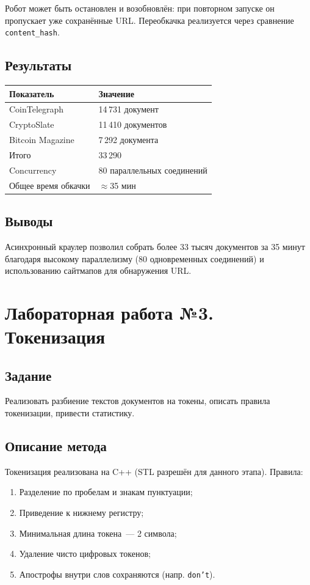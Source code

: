 \documentclass[12pt,a4paper]{article}
\begin{document}
Робот может быть остановлен и возобновлён: при повторном запуске он пропускает уже
сохранённые URL. Переобкачка реализуется через сравнение \texttt{content\_hash}.

\subsection{Результаты}
\begin{table}[H]
\centering
\begin{tabular}{ll}
\toprule
\textbf{Показатель} & \textbf{Значение} \\
\midrule
CoinTelegraph & 14\,731 документ \\
CryptoSlate & 11\,410 документов \\
Bitcoin Magazine & 7\,292 документа \\
Итого & 33\,290 \\
Concurrency & 80 параллельных соединений \\
Общее время обкачки & $\approx$35 мин \\
\bottomrule
\end{tabular}
\end{table}

\subsection{Выводы}
Асинхронный краулер позволил собрать более 33 тысяч документов за 35 минут
благодаря высокому параллелизму (80 одновременных соединений) и использованию
сайтмапов для обнаружения URL.

\section{Лабораторная работа №3. Токенизация}

\subsection{Задание}
Реализовать разбиение текстов документов на токены, описать правила токенизации,
привести статистику.

\subsection{Описание метода}
Токенизация реализована на C++ (STL разрешён для данного этапа). Правила:
\begin{enumerate}
    \item Разделение по пробелам и знакам пунктуации;
    \item Приведение к нижнему регистру;
    \item Минимальная длина токена~--- 2 символа;
    \item Удаление чисто цифровых токенов;
    \item Апострофы внутри слов сохраняются (напр. \texttt{don't}).
\end{enumerate}
\end{document}
